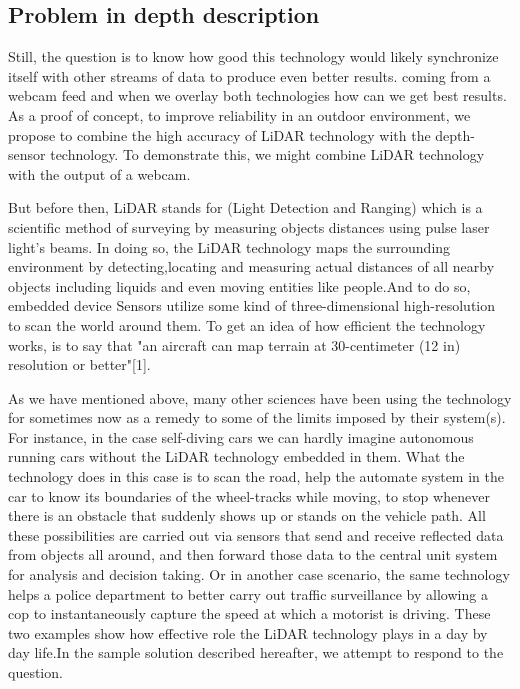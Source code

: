 \documentclass[10pt,draftclsnofoot,onecolumn,journal,compsoc]{IEEEtran}
\begin{document}
\subsection{Problem in depth description}

Still, the question is to know how good this technology would likely synchronize itself with other streams of data to produce even better results. coming from a webcam feed and when we overlay both technologies how can we get  best results. As a proof of concept, to improve reliability in an outdoor environment, we propose to combine the high accuracy of LiDAR technology with the depth-sensor technology. To demonstrate this, we might combine LiDAR technology with the output of a webcam. \par 

But before then, LiDAR stands for (Light Detection and Ranging) which is a scientific method of surveying by measuring objects distances using pulse laser light's beams. In doing so, the LiDAR technology maps the surrounding environment by detecting,locating and measuring actual distances of all nearby objects including liquids and even moving entities like people.And to do so, embedded device Sensors utilize some kind of three-dimensional high-resolution to scan the world around them. To get an idea of how efficient the technology works, is to say that "an aircraft can map terrain at 30-centimeter (12 in) resolution or better"[1].\par

As we have mentioned above, many other sciences have been  using the technology for sometimes now as a remedy to some of the limits imposed by their system(s). For instance, in the case self-diving cars we can hardly imagine autonomous running cars without the LiDAR technology embedded in them. What the technology does in this case is to scan the road, help the automate system in the car to know its boundaries of the wheel-tracks while moving, to stop whenever there is an obstacle that suddenly shows up or stands on the vehicle path. All these possibilities are carried out via sensors that send and receive reflected data from objects all around, and then forward those data to the central unit system for analysis and decision taking. Or in another case scenario, the same technology helps a police department to better carry out traffic surveillance by allowing a cop to instantaneously capture the speed at which a motorist is driving. These two examples show how effective role the LiDAR technology plays in a day by day life.In the sample solution described hereafter, we attempt to respond to the question.\par
 
\end{document}
